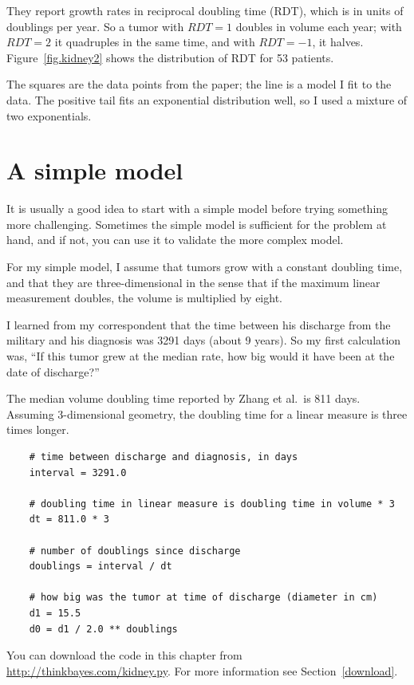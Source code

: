 \documentclass[12pt]{book}
\begin{document}
They report growth rates in reciprocal doubling time (RDT),
which is in units of doublings per year.  So a tumor with $RDT=1$
doubles in volume each year; with $RDT=2$ it quadruples in the same
time, and with $RDT=-1$, it halves.  Figure~\ref{fig.kidney2} shows the
distribution of RDT for 53 patients.

The squares are the data points from the paper; the line is a model I
fit to the data.  The positive tail fits an exponential distribution
well, so I used a mixture of two exponentials.



\section{A simple model}

It is usually a good idea to start with a simple model before
trying something more challenging.  Sometimes the simple model is
sufficient for the problem at hand, and if not, you can use it
to validate the more complex model.

For my simple model, I assume that tumors grow with a constant
doubling time, and that they are three-dimensional in the sense that
if the maximum linear measurement doubles, the volume is multiplied by
eight.

I learned from my correspondent that the time between his discharge
from the military and his diagnosis was 3291 days (about 9 years).
So my first calculation was, ``If this tumor grew at the median
rate, how big would it have been at the date of discharge?''

The median volume doubling time reported by Zhang et al.~is 811 days.
Assuming 3-dimensional geometry, the doubling time for a linear
measure is three times longer.

\begin{verbatim}
    # time between discharge and diagnosis, in days 
    interval = 3291.0

    # doubling time in linear measure is doubling time in volume * 3
    dt = 811.0 * 3

    # number of doublings since discharge
    doublings = interval / dt

    # how big was the tumor at time of discharge (diameter in cm)
    d1 = 15.5
    d0 = d1 / 2.0 ** doublings
\end{verbatim}

You can download the code in this chapter from
\url{http://thinkbayes.com/kidney.py}.  For more information
see Section~\ref{download}.
\end{document}
